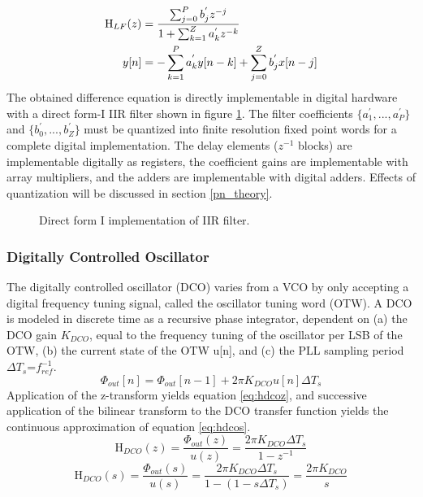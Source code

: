 	\begin{align}
		\textnormal{H}_{LF}(z) &= \frac{\sum_{j=0}^P b_j^{'}z^{-j}}{1+\sum_{k=1}^Z a_k^{'}z^{-k}}\label{eq:canonical_z_tf} \\
		y[n]&= -\sum_{k=1}^P a_k^{'}y[n-k] + \sum_{j=0}^Z b_j^{'}x[n-j] \label{eq:cananical_diff_eq}
	\end{align}
	The obtained difference equation is directly implementable in digital hardware with a direct form-I IIR filter \cite{proakis_1993} shown in figure \ref{fig:filt_implementation}. The filter coefficients $\{a_1^{'}, ..., a_P^{'}\}$ and $\{b_0^{'}, ..., b_Z^{'}\}$ must be quantized into finite resolution fixed point words for a complete digital implementation. The delay elements ($z^{-1}$ blocks) are implementable digitally as registers, the coefficient gains are implementable with array multipliers, and the adders are implementable with digital adders. Effects of quantization will be discussed in section \ref{pn_theory}.
	\begin{figure}[htb!]
		\center
		\caption{Direct form I implementation of IIR filter.}
		\label{fig:filt_implementation}
	\end{figure}


\subsubsection{Digitally Controlled Oscillator}
	The digitally controlled oscillator (DCO) varies from a VCO by only accepting a digital frequency tuning signal, called the oscillator tuning word (OTW). A DCO is modeled in discrete time as a recursive phase integrator, dependent on (a) the DCO gain $K_{DCO}$, equal to the frequency tuning of the oscillator per LSB of the OTW, (b) the current state of the OTW u[n], and (c) the PLL sampling period $\Delta T_s$=$f_{ref}^{-1}$.
	\begin{equation}
		\Phi_{out}[n] = \Phi_{out}[n-1] + 2\pi K_{DCO}u[n]\Delta T_s
	\end{equation}
	Application of the z-transform yields equation \ref{eq:hdcoz}, and successive application of the bilinear transform to the DCO transfer function yields the continuous approximation of equation \ref{eq:hdcos}.
	\begin{equation}\label{eq:hdcoz}
		\mathrm{H}_{DCO}(z) = \frac{\Phi_{out}(z)}{u(z)} = \frac{2\pi K_{DCO}\Delta T_s}{1-z^{-1}}
	\end{equation}
	\begin{equation}\label{eq:hdcos}
		\mathrm{H}_{DCO}(s) = \frac{\Phi_{out}(s)}{u(s)} = \frac{2\pi K_{DCO}\Delta T_s}{1-(1-s\Delta T_s)} = \frac{2\pi K_{DCO}}{s} 
	\end{equation}

